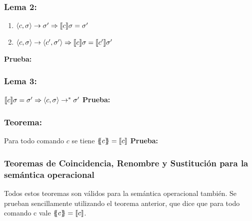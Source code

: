     \subsubsection*{\textbf{Lema 2:}}
      \begin{enumerate}
        \item $\langle c, \sigma\rangle \rightarrow \sigma' \Rightarrow \llbracket c\rrbracket \sigma = \sigma'$
        \item $\langle c, \sigma\rangle \rightarrow \langle c', \sigma'\rangle \Rightarrow \llbracket c\rrbracket \sigma = \llbracket c'\rrbracket\sigma'$
      \end{enumerate}
    \PN \textbf{Prueba:}

    \subsubsection*{\textbf{Lema 3:}} $\llbracket c\rrbracket \sigma = \sigma' \Rightarrow \langle c, \sigma\rangle \rightarrow^{\ast} \sigma'$
    \PN \textbf{Prueba:}

    \subsubsection*{\textbf{Teorema:}} Para todo comando $c$ se tiene $\{\!\!\{c\}\!\!\} = \llbracket c\rrbracket$
    \PN \textbf{Prueba:}

    \subsubsection*{Teoremas de Coincidencia, Renombre y Sustitución para la semántica operacional}
      \PN Todos estos teoremas son válidos para la semántica operacional también. Se prueban sencillamente utilizando el teorema anterior, que dice que para todo comando c vale $\{\!\!\{c\}\!\!\} = \llbracket c\rrbracket$.